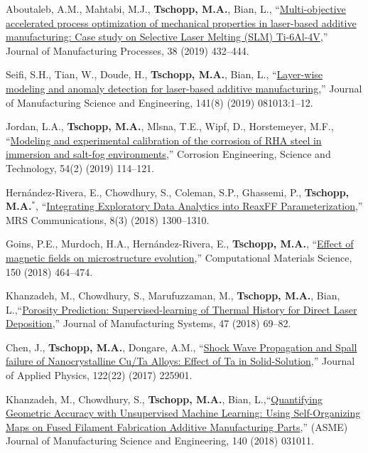 \begin{cvlist}
\item
{Aboutaleb, A.M.}, Mahtabi, M.J., \textbf{Tschopp, M.A.}, Bian, L., ``\href{https://doi.org/10.1016/j.jmapro.2018.12.040}{Multi-objective accelerated process optimization of mechanical properties in laser-based additive manufacturing: Case study on Selective Laser Melting (SLM) Ti-6Al-4V},'' Journal of Manufacturing Processes, 38 (2019) 432--444.

\item
Seifi, S.H., Tian, W., Doude, H., \textbf{Tschopp, M.A.}, Bian, L.,  ``\href{https://doi.org/10.1115/1.4043898}{Layer-wise modeling and anomaly detection for laser-based additive manufacturing},'' Journal of Manufacturing Science and Engineering, 141(8) (2019) 081013:1--12.

\item
Jordan, L.A., \textbf{Tschopp, M.A.}, Mlsna, T.E., Wipf, D., Horstemeyer, M.F., ``\href{https://doi.org/10.1080/1478422X.2018.1542550}{Modeling and experimental calibration of the corrosion of RHA steel in immersion and salt-fog environments},'' Corrosion Engineering, Science and Technology, 54(2) (2019) 114--121.

\item
Hern\'{a}ndez-Rivera, E., Chowdhury, S., Coleman, S.P., Ghassemi, P., \textbf{Tschopp, M.A.}$^\ast$, ``\href{https://doi.org/10.1557/mrc.2018.155}{Integrating Exploratory Data Analytics into ReaxFF Parameterization},'' MRS Communications, 8(3) (2018) 1300--1310. 

\item
{Goins, P.E.}, Murdoch, H.A., Hern\'{a}ndez-Rivera, E.,  \textbf{Tschopp, M.A.}, ``\href{https://doi.org/10.1016/j.commatsci.2018.04.034}{Effect of magnetic fields on microstructure evolution},'' Computational Materials Science, 150 (2018) 464--474.

\item
{Khanzadeh, M.}, {Chowdhury, S.},  Marufuzzaman, M., \textbf{Tschopp, M.A.}, Bian, L.,``\href{https://doi.org/10.1016/j.jmsy.2018.04.001}{Porosity Prediction: Supervised-learning of Thermal History for Direct Laser Deposition},'' Journal of Manufacturing Systems, 47 (2018) 69--82.

\item
{Chen, J.}, \textbf{Tschopp, M.A.}, Dongare, A.M., ``\href{https://doi.org/10.1063/1.5001761}{Shock Wave Propagation and Spall failure of Nanocrystalline Cu/Ta Alloys: Effect of Ta in Solid-Solution},'' Journal of Applied Physics, 122(22) (2017) 225901.

\item
{Khanzadeh, M.}, {Chowdhury, S.}, \textbf{Tschopp, M.A.}, Bian, L.,``\href{https://doi.org/10.1115/1.4038598}{Quantifying Geometric Accuracy with Unsupervised Machine Learning: Using Self-Organizing Maps on Fused Filament Fabrication Additive Manufacturing Parts},'' (ASME) Journal of Manufacturing Science and Engineering, 140 (2018) 031011.


\end{cvlist}
